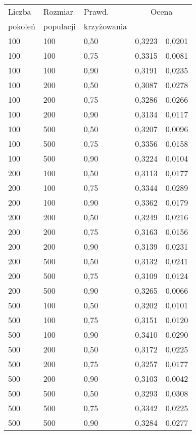 \documentclass[11pt,a4paper,oneside]{report}
\begin{document}
\begin{center}
	\begin{longtable}{|l|l|l|r@{$\pm$}r|}
		\hline
		Liczba & Rozmiar & Prawd. & \multicolumn{2}{|c|}{Ocena}\\
		pokoleń & populacji & krzyżowania & \multicolumn{2}{|c|}{}\\ \hline \hline\endhead
		100 & 100 & 0,50 & 0,3223 & 0,0201\\ \hline
		100 & 100 & 0,75 & 0,3315 & 0,0081\\ \hline
		100 & 100 & 0,90 & 0,3191 & 0,0235\\ \hline
		100 & 200 & 0,50 & 0,3087 & 0,0278\\ \hline
		100 & 200 & 0,75 & 0,3286 & 0,0266\\ \hline
		100 & 200 & 0,90 & 0,3134 & 0,0117\\ \hline
		100 & 500 & 0,50 & 0,3207 & 0,0096\\ \hline
		100 & 500 & 0,75 & 0,3356 & 0,0158\\ \hline
		100 & 500 & 0,90 & 0,3224 & 0,0104\\ \hline
		200 & 100 & 0,50 & 0,3113 & 0,0177\\ \hline
		200 & 100 & 0,75 & 0,3344 & 0,0289\\ \hline
		200 & 100 & 0,90 & 0,3362 & 0,0179\\ \hline
		200 & 200 & 0,50 & 0,3249 & 0,0216\\ \hline
		200 & 200 & 0,75 & 0,3163 & 0,0156\\ \hline
		200 & 200 & 0,90 & 0,3139 & 0,0231\\ \hline
		200 & 500 & 0,50 & 0,3132 & 0,0241\\ \hline
		200 & 500 & 0,75 & 0,3109 & 0,0124\\ \hline
		200 & 500 & 0,90 & 0,3265 & 0,0066\\ \hline
		500 & 100 & 0,50 & 0,3202 & 0,0101\\ \hline
		500 & 100 & 0,75 & 0,3151 & 0,0120\\ \hline
		500 & 100 & 0,90 & 0,3410 & 0,0290\\ \hline
		500 & 200 & 0,50 & 0,3172 & 0,0225\\ \hline
		500 & 200 & 0,75 & 0,3257 & 0,0177\\ \hline
		500 & 200 & 0,90 & 0,3103 & 0,0042\\ \hline
		500 & 500 & 0,50 & 0,3293 & 0,0308\\ \hline
		500 & 500 & 0,75 & 0,3342 & 0,0225\\ \hline
		500 & 500 & 0,90 & 0,3284 & 0,0277\\ \hline
	\end{longtable}
\end{center}
\end{document}
